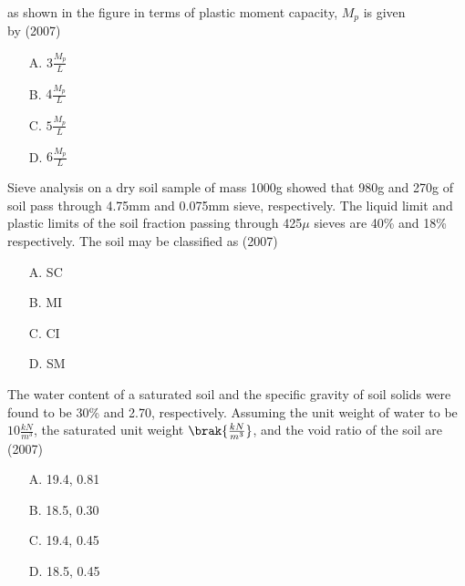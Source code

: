   as shown in the figure in terms of plastic moment capacity, $M_p$ is given\\ by \hfill (2007)
  \begin{figure}[!ht]
    \centering
    \caption{ }
    \label{5 }
  \end{figure}
  \begin{enumerate}
    \item [A.] $3\frac{M_p}{L}$
    \item [B.] $4\frac{M_p}{L}$
    \item [C.] $5\frac{M_p}{L}$
    \item [D.] $6\frac{M_p}{L}$
  \end{enumerate}
  \item Sieve analysis on a dry soil sample of mass 1000g showed that 980g and 270g of
  soil pass through 4.75mm and 0.075mm sieve, respectively. The liquid limit and
  plastic limits of the soil fraction passing through 425$\mu$ sieves are 40\% and 18\%
  respectively. The soil may be classified as \hfill (2007)
  \begin{enumerate}
    \item [A.] SC
    \item [B.] MI
    \item [C.] CI
    \item [D.] SM
  \end{enumerate}
  \item The water content of a saturated soil and the specific gravity of soil solids were
  found to be 30\% and 2.70, respectively. Assuming the unit weight of water to be
  $10\frac{kN}{m^3}$, the saturated unit weight $\brak{\frac{kN}{m^3}}$, and the void ratio of the soil are \hfill (2007)
  \begin{enumerate}
    \item [A.] 19.4, 0.81
    \item [B.] 18.5, 0.30
    \item [C.] 19.4, 0.45
    \item [D.] 18.5, 0.45
  \end{enumerate}
